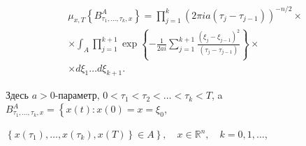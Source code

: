\documentclass[10pt]{article}
\begin{document}
\[

\begin{aligned}

& \mu_{x, T}\left\{B_{\tau_{1}, \ldots, \tau_{k}, x}^{A}\right\}=\prod_{j=1}^{k}\left(2 \pi i a\left(\tau_{j}-\tau_{j-1}\right)\right)^{-n / 2} \times \\

& \times \int_{A} \prod_{j=1}^{k+1} \exp \left\{-\frac{1}{2 a i} \sum_{j=1}^{k+1} \frac{\left(\xi_{j}-\xi_{j-1}\right)^{2}}{\left(\tau_{j}-\tau_{j-1}\right)}\right\} \times \\

& \times d \xi_{1} \ldots d \xi_{k+1} .

\end{aligned}

\]



Здесь $a>0$-параметр, $0<\tau_{1}<\tau_{2}<\ldots<\tau_{k}<T$, a $B_{\tau_{1}, \ldots, \tau_{k}, x}^{A}=\left\{x(t): x(0)=x=\xi_{0}\right.$,



$\left.\left\{x\left(\tau_{1}\right), \ldots, x\left(\tau_{k}\right), x(T)\right\} \in A\right\}, \quad x \in \mathbb{R}^{n}, \quad k=0,1, \ldots$,
\end{document}
